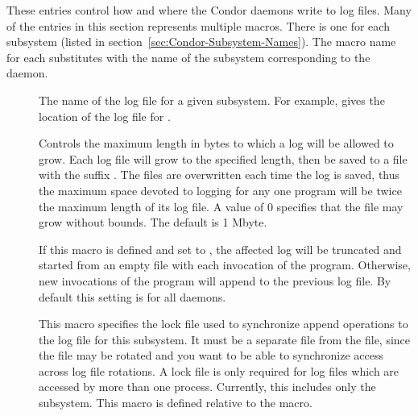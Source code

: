 These entries control how and where the Condor daemons write to log
files.  Many of the entries in this section represents multiple
macros. There is one for each subsystem (listed
in section~\ref{sec:Condor-Subsystem-Names}).
The macro name for each substitutes  with the name
of the subsystem corresponding to the daemon.
\begin{description}
  
\item[] \label{param:SubsysLog}
  The name of
  the log file for a given subsystem.  For example,
   gives the location of the log file for
  .

\item[] \label{param:MaxSubsysLog} Controls
  the maximum length in bytes to which a
  log will be allowed to grow.  Each log file will grow to the
  specified length, then be saved to a file with the suffix
  .  The 
  files are overwritten each time the log is saved, thus the maximum
  space devoted to logging for any one program will be twice the
  maximum length of its log file.  A value of 0 specifies that the
  file may grow without bounds.  The default is 1 Mbyte.

\item[]
  \label{param:TruncSubsysLogOnOpen}  If this macro is defined and set
  to , the affected log will be truncated and started from an
  empty file with each invocation of the program.  Otherwise, new
  invocations of the program will append to the previous log
  file.  By default this setting is  for all daemons. 

\item[] \label{param:SubsysLock} 
This macro
  specifies the lock file used to synchronize append operations to the
  log file for this subsystem.  It must be a separate file from the
   file, since the  file may be
  rotated and you want to be able to synchronize access across log
  file rotations.  A lock file is only required for log files which
  are accessed by more than one process.  Currently, this includes
  only the  subsystem.  This macro is defined relative
  to the  macro.


\end{description}
